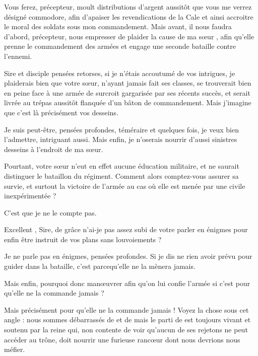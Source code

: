 \begin{drama}
  \elenaspeaks   Vous ferez, précepteur, moult distributions d’argent aussitôt que vous me verrez désigné commodore, afin d’apaiser les revendications de la Cale et ainsi accroitre le moral des soldats sous mon commandement.  Mais avant, il nous faudra d’abord, précepteur, nous empresser de plaider la cause de ma sœur \ela, afin qu’elle prenne le commandement des armées et engage une seconde bataille contre l’ennemi.

  \alexasspeaks Sire et disciple \elena pensées retorses, si je n’étais accoutumé de vos intrigues, je plaiderais bien que \ela votre sœur, n’ayant jamais fait ses classes, se trouverait bien en peine face à une armée de surcroit gargarisée par ses récents succès, et serait livrée au trépas aussitôt flanquée d’un bâton de commandement. Mais j’imagine que c’est là précisément vos desseins.

  \elenaspeaks  {} Je suis peut-être, \alexas pensées profondes, téméraire et quelques fois, je veux bien l’admettre, intriguant aussi.
  Mais enfin, je n’oserais nourrir d’aussi sinistres desseins à l’endroit de ma sœur.

  \alexasspeaks Pourtant, votre sœur n’eut en effet aucune éducation militaire, et ne saurait distinguer le bataillon du régiment. Comment alors comptez-vous assurer sa survie, et surtout la victoire de l’armée  au cas où elle est menée par une civile inexpérimentée ?

  \elenaspeaks  C’est que je ne le compte pas.

  \alexasspeaks Excellent \elena, Sire, de grâce n’ai-je pas assez subi de votre parler en énigmes pour enfin être instruit de vos plans sans louvoiements ?

  \elenaspeaks  Je ne parle pas en énigmes, \alexas pensées profondes. Si je dis ne rien avoir prévu pour guider \ela{} dans la bataille, c’est parcequ’elle ne la mènera jamais.

  \alexasspeaks Mais enfin, pourquoi donc manœuvrer afin qu’on lui confie l’armée si c’est pour qu’elle ne la commande jamais ?

  \elenaspeaks  Mais précisément pour qu’elle ne la commande jamais ! Voyez la chose sous cet angle : nous sommes débarrassés de \general{} et de \princesse{} mais le parti de \princesse{} est toujours vivant et soutenu par la reine qui, non contente de voir qu’aucun de ses rejetons ne peut accéder au trône, doit nourrir une furieuse rancœur dont nous devrions nous méfier.


\end{drama}
